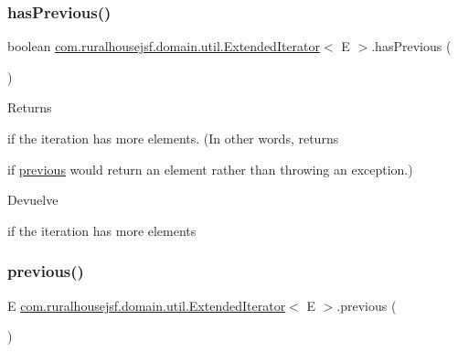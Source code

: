 \subsubsection{\texorpdfstring{hasPrevious()}{hasPrevious()}}
{\footnotesize\ttfamily boolean \mbox{\hyperlink{interfacecom_1_1ruralhousejsf_1_1domain_1_1util_1_1_extended_iterator}{com.\+ruralhousejsf.\+domain.\+util.\+Extended\+Iterator}}$<$ E $>$.has\+Previous (\begin{DoxyParamCaption}{ }\end{DoxyParamCaption})}

Returns
\begin{DoxyCode}{0}
\DoxyCodeLine{\textcolor{keyword}{true} }
\end{DoxyCode}
 if the iteration has more elements. (In other words, returns
\begin{DoxyCode}{0}
\DoxyCodeLine{\textcolor{keyword}{true} }
\end{DoxyCode}
 if \mbox{\hyperlink{interfacecom_1_1ruralhousejsf_1_1domain_1_1util_1_1_extended_iterator_a4c9f9f5da6e96c08bc44d55517689397}{previous}} would return an element rather than throwing an exception.)

\begin{DoxyReturn}{Devuelve}

\begin{DoxyCode}{0}
\DoxyCodeLine{\textcolor{keyword}{true} }
\end{DoxyCode}
 if the iteration has more elements 
\end{DoxyReturn}
\mbox{\label{interfacecom_1_1ruralhousejsf_1_1domain_1_1util_1_1_extended_iterator_a4c9f9f5da6e96c08bc44d55517689397}} 
\subsubsection{\texorpdfstring{previous()}{previous()}}
{\footnotesize\ttfamily E \mbox{\hyperlink{interfacecom_1_1ruralhousejsf_1_1domain_1_1util_1_1_extended_iterator}{com.\+ruralhousejsf.\+domain.\+util.\+Extended\+Iterator}}$<$ E $>$.previous (\begin{DoxyParamCaption}{ }\end{DoxyParamCaption})}

